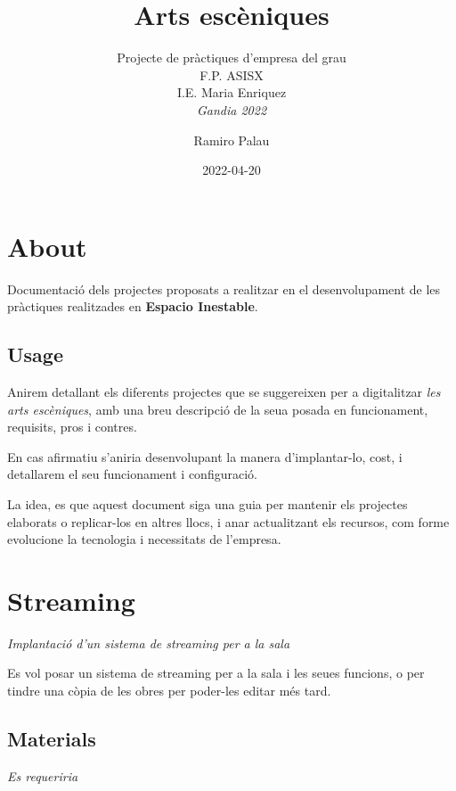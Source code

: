 \documentclass[
  10pt,
]{krantz}
\title{Arts escèniques}
\subtitle{Projecte de pràctiques d'empresa del grau\\
F.P. ASISX\\
I.E. Maria Enriquez\\
\emph{Gandia 2022}}
\author{Ramiro Palau}
\date{2022-04-20}
\begin{document}
\maketitle

{
\hypersetup{linkcolor=}
\setcounter{tocdepth}{2}
\tableofcontents
}
\hypertarget{about}{%
\chapter*{About}\label{about}}


Documentació dels projectes proposats a realitzar en el desenvolupament de les pràctiques realitzades en \textbf{Espacio Inestable}.

\hypertarget{usage}{%
\section*{Usage}\label{usage}}


Anirem detallant els diferents projectes que se suggereixen per a digitalitzar \emph{les arts escèniques}, amb una breu descripció de la seua posada en funcionament, requisits, pros i contres.

En cas afirmatiu s'aniria desenvolupant la manera d'implantar-lo, cost, i detallarem el seu funcionament i configuració.

La idea, es que aquest document siga una guia per mantenir els projectes elaborats o replicar-los en altres llocs, i anar actualitzant els recursos, com forme evolucione la tecnologia i necessitats de l'empresa.

\hypertarget{streaming}{%
\chapter{Streaming}\label{streaming}}

\emph{Implantació d'un sistema de streaming per a la sala}

Es vol posar un sistema de streaming per a la sala i les seues funcions, o per tindre una còpia de les obres per poder-les editar més tard.

\hypertarget{materials}{%
\section{Materials}\label{materials}}

\emph{Es requeriria}
\end{document}
